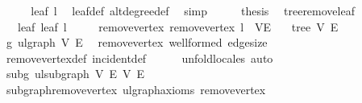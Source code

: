 \begin{isabellebody}
\ \ \isamarkupfalse%
\ \isamarkupfalse%
\ {\isachardoublequoteopen}leaf\ l{\isachardoublequoteclose}\ \isamarkupfalse%
\ leaf{\isacharunderscore}{\kern0pt}def\ alt{\isacharunderscore}{\kern0pt}degree{\isacharunderscore}{\kern0pt}def\ \isamarkupfalse%
\ simp\isanewline
\ \ \isamarkupfalse%
\ \isamarkupfalse%
\ {\isacharquery}{\kern0pt}thesis\ \isacommand{{\isachardot}{\kern0pt}{\isachardot}{\kern0pt}}\isamarkupfalse%
\isanewline
{}\isamarkupfalse%
%
\endisatagproof
{\isafoldproof}%
%
\isadelimproof
\isanewline
%
\endisadelimproof
\isanewline
{}\isamarkupfalse%
\ tree{\isacharunderscore}{\kern0pt}remove{\isacharunderscore}{\kern0pt}leaf{\isacharcolon}{\kern0pt}\isanewline
\ \ \ leaf{\isacharcolon}{\kern0pt}\ {\isachardoublequoteopen}leaf\ l{\isachardoublequoteclose}\isanewline
\ \ \ \ \ remove{\isacharunderscore}{\kern0pt}vertex{\isacharcolon}{\kern0pt}\ {\isachardoublequoteopen}remove{\isacharunderscore}{\kern0pt}vertex\ l\ {\isacharequal}{\kern0pt}\ {\isacharparenleft}{\kern0pt}V{\isacharprime}{\kern0pt}{\isacharcomma}{\kern0pt}E{\isacharprime}{\kern0pt}{\isacharparenright}{\kern0pt}{\isachardoublequoteclose}\isanewline
\ \ \ {\isachardoublequoteopen}tree\ V{\isacharprime}{\kern0pt}\ E{\isacharprime}{\kern0pt}{\isachardoublequoteclose}\isanewline
%
\isadelimproof
%
\endisadelimproof
%
\isatagproof
{}\isamarkupfalse%
{\isacharminus}{\kern0pt}\isanewline
\ \ \isamarkupfalse%
\ g{\isacharprime}{\kern0pt}{\isacharcolon}{\kern0pt}\ ulgraph\ V{\isacharprime}{\kern0pt}\ E{\isacharprime}{\kern0pt}\ \isamarkupfalse%
\ remove{\isacharunderscore}{\kern0pt}vertex\ wellformed\ edge{\isacharunderscore}{\kern0pt}size\ \isamarkupfalse%
\ remove{\isacharunderscore}{\kern0pt}vertex{\isacharunderscore}{\kern0pt}def\ incident{\isacharunderscore}{\kern0pt}def\isanewline
\ \ \ \ \isamarkupfalse%
\ {\isacharparenleft}{\kern0pt}unfold{\isacharunderscore}{\kern0pt}locales{\isacharcomma}{\kern0pt}\ auto{\isacharparenright}{\kern0pt}\isanewline
\ \ \isamarkupfalse%
\ subg{\isacharcolon}{\kern0pt}\ ulsubgraph\ V{\isacharprime}{\kern0pt}\ E{\isacharprime}{\kern0pt}\ V\ E\ \isamarkupfalse%
\ subgraph{\isacharunderscore}{\kern0pt}remove{\isacharunderscore}{\kern0pt}vertex\ ulgraph{\isacharunderscore}{\kern0pt}axioms\ remove{\isacharunderscore}{\kern0pt}vertex\isanewline

\end{isabellebody}
